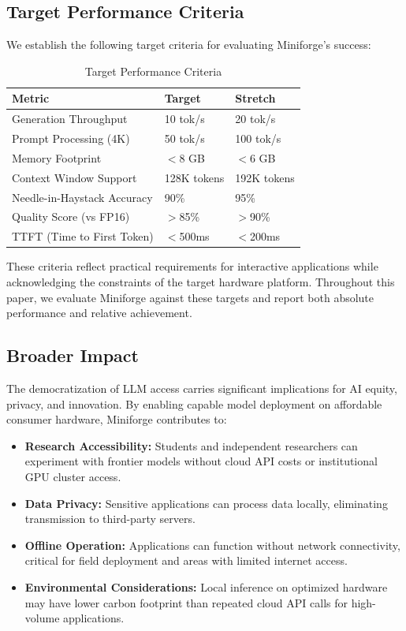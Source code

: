 \subsection{Target Performance Criteria}

We establish the following target criteria for evaluating Miniforge's success:

\begin{table}[h]
\centering
\caption{Target Performance Criteria}
\label{tab:target_criteria}
\begin{tabular}{lll}
\toprule
\textbf{Metric} & \textbf{Target} & \textbf{Stretch} \\
\midrule
Generation Throughput & 10 tok/s & 20 tok/s \\
Prompt Processing (4K) & 50 tok/s & 100 tok/s \\
Memory Footprint & $<$8 GB & $<$6 GB \\
Context Window Support & 128K tokens & 192K tokens \\
Needle-in-Haystack Accuracy & 90\% & 95\% \\
Quality Score (vs FP16) & $>$85\% & $>$90\% \\
TTFT (Time to First Token) & $<$500ms & $<$200ms \\
\bottomrule
\end{tabular}
\end{table}

These criteria reflect practical requirements for interactive applications while acknowledging the constraints of the target hardware platform. Throughout this paper, we evaluate Miniforge against these targets and report both absolute performance and relative achievement.

\subsection{Broader Impact}

The democratization of LLM access carries significant implications for AI equity, privacy, and innovation. By enabling capable model deployment on affordable consumer hardware, Miniforge contributes to:

\begin{itemize}
    \item \textbf{Research Accessibility:} Students and independent researchers can experiment with frontier models without cloud API costs or institutional GPU cluster access.
    \item \textbf{Data Privacy:} Sensitive applications can process data locally, eliminating transmission to third-party servers.
    \item \textbf{Offline Operation:} Applications can function without network connectivity, critical for field deployment and areas with limited internet access.
    \item \textbf{Environmental Considerations:} Local inference on optimized hardware may have lower carbon footprint than repeated cloud API calls for high-volume applications.
\end{itemize}

